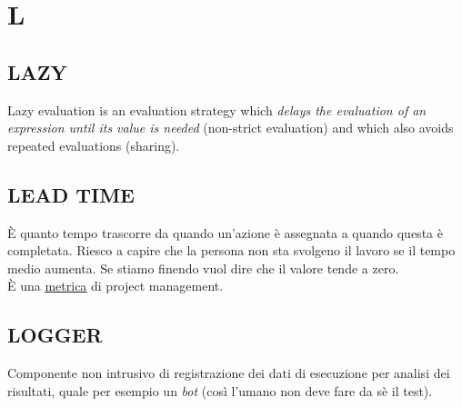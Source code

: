 \newpage
	\section{L} \label{sec:L}
	
		\subsection{LAZY}  \label{lazy}
		Lazy evaluation is an evaluation strategy which \textit{delays the evaluation of an expression until its value is needed} (non-strict evaluation) and which also avoids repeated evaluations (sharing).


		\subsection{LEAD TIME}	 \label{leadtime}
		È quanto tempo trascorre da quando un'azione è assegnata a quando questa è completata. Riesco a capire che la persona non sta svolgeno il lavoro se il tempo medio aumenta. Se stiamo finendo vuol dire che il valore tende a zero. \\
		È una \underline{\hyperref[metrica]{metrica}} di project management.


		\subsection{LOGGER}		\label{logger}
		Componente non intrusivo di registrazione dei dati di esecuzione per analisi dei risultati, quale per esempio un \textit{bot} (così l'umano non deve fare da sè il test).

		
	
	
